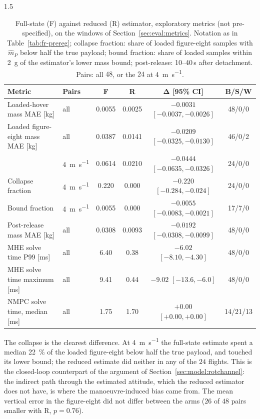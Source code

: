 \begin{spacing}{1.5}
\begin{table}[ht]
\centering
\caption[Full-state against reduced estimator: exploratory metrics]{Full-state
(F) against reduced (R) estimator, exploratory metrics (not pre-specified), on
the windows of Section~\ref{sec:eval:metrics}. Notation as in
Table~\ref{tab:fr-prereg}; collapse fraction: share of loaded figure-eight samples
with $\hat m_P$ below half the true payload; bound fraction: share of loaded
samples within \SI{2}{\gram} of the estimator's lower mass bound; post-release:
10--40\,s after detachment. Pairs: all $48$, or the $24$ at
\SI{4}{\meter\per\second}.}
\label{tab:fr-explore}
\footnotesize
\setlength{\tabcolsep}{2.5pt}
\begin{tabular}{@{}l l c c c c@{}}
\toprule
\textbf{Metric} & \textbf{Pairs} & \textbf{F} & \textbf{R} & $\bm\Delta$ [95\% CI] & \textbf{B/S/W} \\
\midrule
Loaded-hover mass MAE [kg]        & all & 0.0055 & 0.0025 & $-0.0031$ $[-0.0037, -0.0026]$ & 48/0/0 \\
Loaded figure-eight mass MAE [kg] & all & 0.0387 & 0.0141 & $-0.0209$ $[-0.0325, -0.0130]$ & 46/0/2 \\
                                  & \SI{4}{\meter\per\second} & 0.0614 & 0.0210 & $-0.0444$ $[-0.0635, -0.0326]$ & 24/0/0 \\
Collapse fraction                 & \SI{4}{\meter\per\second} & 0.220 & 0.000 & $-0.220$ $[-0.284, -0.024]$ & 24/0/0 \\
Bound fraction                    & \SI{4}{\meter\per\second} & 0.0055 & 0.000 & $-0.0055$ $[-0.0083, -0.0021]$ & 17/7/0 \\
Post-release mass MAE [kg] & all & 0.0308 & 0.0093 & $-0.0192$ $[-0.0308, -0.0099]$ & 48/0/0 \\
MHE solve time P99 [ms]           & all & 6.40 & 0.38 & $-6.02$ $[-8.10, -4.30]$ & 48/0/0 \\
MHE solve time maximum [ms]       & all & 9.41 & 0.44 & $-9.02$ $[-13.6, -6.0]$ & 48/0/0 \\
NMPC solve time, median [ms]      & all & 1.75 & 1.70 & $+0.00$ $[+0.00, +0.00]$ & 14/21/13 \\
\bottomrule
\end{tabular}
\end{table}

The collapse is the clearest difference. At \SI{4}{\meter\per\second} the
full-state estimate spent a median \SI{22}{\percent} of the loaded figure-eight
below half the true payload, and touched its lower bound; the reduced estimate
did neither in any of the $24$ flights. This is the closed-loop counterpart of
the argument of Section~\ref{sec:model:rotchannel}: the indirect path through the
estimated attitude, which the reduced estimator does not have, is where the
manoeuvre-induced bias came from. The mean vertical error in the figure-eight
did not differ between the arms ($26$ of $48$ pairs smaller with R, $p=0.76$).


\end{spacing}
